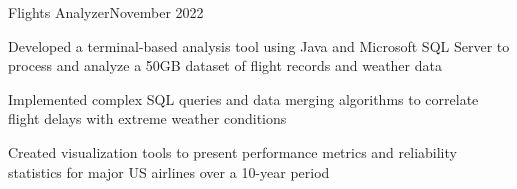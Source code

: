 \begin{resume_subsection}{Flights Analyzer}{November 2022}
    \begin{subitems}
        \item Developed a terminal-based analysis tool using Java and Microsoft SQL Server to process and analyze a 50GB dataset of flight records and weather data
        \item Implemented complex SQL queries and data merging algorithms to correlate flight delays with extreme weather conditions
        \item Created visualization tools to present performance metrics and reliability statistics for major US airlines over a 10-year period
    \end{subitems}
\end{resume_subsection}

